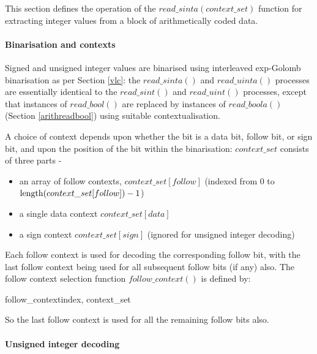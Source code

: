 \label{arithreadint}

This section defines the operation of the $read\_sinta(context\_set)$ function
 for extracting integer values from a block of arithmetically coded data.

\paragraph{Binarisation and contexts \\}

Signed and unsigned integer values are binarised using interleaved exp-Golomb
 binarisation as per Section \ref{vlc}: the $read\_sinta()$ and $read\_uinta()$
processes are essentially identical to the 
$read\_sint()$ and $read\_uint()$ processes, except that instances of $read\_bool()$ are replaced
by instances of $read\_boola()$ (Section \ref{arithreadbool}) using suitable contextualisation. 

A choice of context depends upon whether the bit is a data bit, follow bit, or sign bit, and upon the 
position of the bit within the binarisation: $context\_set$ consists of three parts -
\begin{itemize}
\item an array of follow contexts, $context\_set[follow]$ (indexed from 0 to 
$\operatorname{length}(context\_set[follow])-1$)
\item a single data context $context\_set[data]$ 
\item a sign context $context\_set[sign]$ (ignored for unsigned integer decoding)
\end{itemize}

Each follow context is used for decoding the corresponding follow bit, with the
last follow context being used for all subsequent follow bits (if any) also. 
The follow context selection function $follow\_context()$ is defined by:

\begin{pseudo}{follow\_context}{index, context\_set}
\end{pseudo}

So the last follow context is used for all the remaining follow bits also.

\paragraph{Unsigned integer decoding \\}

